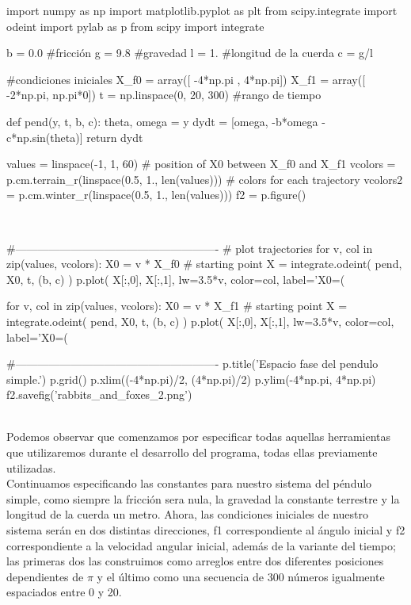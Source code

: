 \documentclass[12pt]{article}
\begin{document}
\begin{boxedverbatim}
import numpy as np
import matplotlib.pyplot as plt
from scipy.integrate import odeint
import pylab as p
from scipy import integrate

b = 0.0 #fricción
g = 9.8 #gravedad
l = 1. #longitud de la cuerda
c = g/l

#condiciones iniciales 
X_f0 = array([ -4*np.pi , 4*np.pi])
X_f1 = array([ -2*np.pi, np.pi*0])
t = np.linspace(0, 20, 300) #rango de tiempo

def pend(y, t, b, c):
     theta, omega = y
     dydt = [omega, -b*omega - c*np.sin(theta)]
     return dydt

values  = linspace(-1, 1, 60)                          
# position of X0 between X_f0 and X_f1
vcolors = p.cm.terrain_r(linspace(0.5, 1., len(values)))  
# colors for each trajectory
vcolors2 = p.cm.winter_r(linspace(0.5, 1., len(values)))
f2 = p.figure()
\end{boxedverbatim}
\\
\begin{boxedverbatim}
#-------------------------------------------------------
# plot trajectories
for v, col in zip(values, vcolors):
    X0 = v * X_f0                               
    # starting point
    X = integrate.odeint( pend, X0, t, (b, c) )        
    p.plot( X[:,0], X[:,1], lw=3.5*v, color=col,
    label='X0=(%
     
for v, col in zip(values, vcolors):
    X0 = v * X_f1                               
    # starting point
    X = integrate.odeint( pend, X0, t, (b, c) )        
    p.plot( X[:,0], X[:,1], lw=3.5*v, color=col,
    label='X0=(%

#-------------------------------------------------------
p.title('Espacio fase del pendulo simple.')
p.grid()
p.xlim((-4*np.pi)/2, (4*np.pi)/2)
p.ylim(-4*np.pi, 4*np.pi)
f2.savefig('rabbits_and_foxes_2.png')
\end{boxedverbatim}
\\
Podemos observar que comenzamos por especificar todas aquellas herramientas que utilizaremos durante el desarrollo del programa, todas ellas previamente utilizadas.\\

Continuamos especificando las constantes para nuestro sistema del péndulo simple, como siempre la fricción sera nula, la gravedad la constante terrestre y la longitud de la cuerda un metro. Ahora, las condiciones iniciales de nuestro sistema serán en dos distintas direcciones, f1 correspondiente al ángulo inicial y f2 correspondiente a la velocidad angular inicial, además de la variante del tiempo; las primeras dos las construimos como arreglos entre dos diferentes posiciones dependientes de $\pi$ y el último como una secuencia de 300 números igualmente espaciados entre 0 y 20.\\
\end{document}
